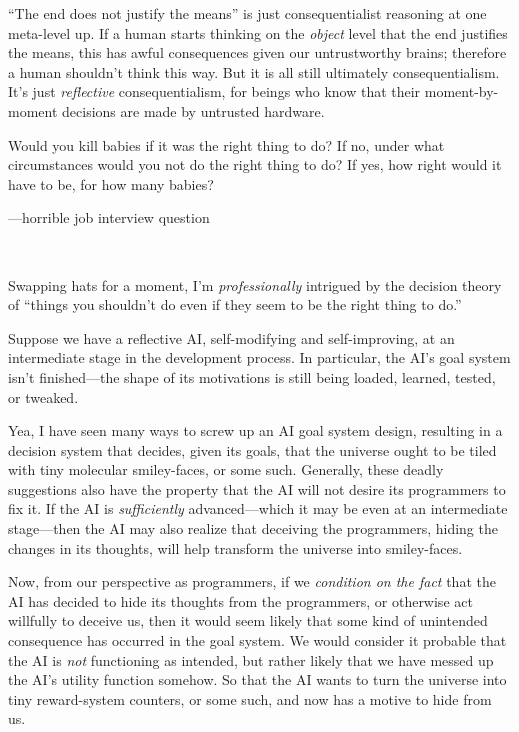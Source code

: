 {
 ``The end does not justify the
means'' is just consequentialist reasoning at one
meta-level up. If a human starts thinking on the \textit{object} level
that the end justifies the means, this has awful consequences given our
untrustworthy brains; therefore a human shouldn't think
this way. But it is all still ultimately consequentialism.
It's just \textit{reflective} consequentialism, for
beings who know that their moment-by-moment decisions are made by
untrusted hardware.}

\myendsectiontext


{
 Would you kill babies if it was the right thing to do? If no,
under what circumstances would you not do the right thing to do? If
yes, how right would it have to be, for how many babies?}

{\raggedleft
 {}---horrible job interview question
\par}


\bigskip

{
 ~}

{
 Swapping hats for a moment, I'm
\textit{professionally} intrigued by the decision theory of
``things you shouldn't do even if they
seem to be the right thing to do.''}

{
 Suppose we have a reflective AI, self-modifying and
self-improving, at an intermediate stage in the development process. In
particular, the AI's goal system isn't
finished---the shape of its motivations is still being loaded, learned,
tested, or tweaked.}

{
 Yea, I have seen many ways to screw up an AI goal system design,
resulting in a decision system that decides, given its goals, that the
universe ought to be tiled with tiny molecular smiley-faces, or some
such. Generally, these deadly suggestions also have the property that
the AI will not desire its programmers to fix it. If the AI is
\textit{sufficiently} advanced---which it may be even at an
intermediate stage---then the AI may also realize that deceiving the
programmers, hiding the changes in its thoughts, will help transform
the universe into smiley-faces.}

{
 Now, from our perspective as programmers, if we \textit{condition
on the fact} that the AI has decided to hide its thoughts from the
programmers, or otherwise act willfully to deceive us, then it would
seem likely that some kind of unintended consequence has occurred in
the goal system. We would consider it probable that the AI is
\textit{not} functioning as intended, but rather likely that we have
messed up the AI's utility function somehow. So that
the AI wants to turn the universe into tiny reward-system counters, or
some such, and now has a motive to hide from us.}


